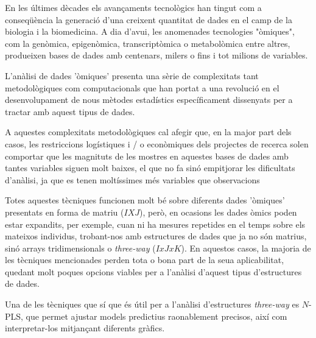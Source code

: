 
En les últimes dècades els avançaments tecnològics han tingut com a conseqüència la generació d'una creixent quantitat de dades en el camp de la biologia i la biomedicina. A dia d'avui, les anomenades tecnologies "òmiques", com la genòmica, epigenòmica, transcriptòmica o metabolòmica entre altres, produeixen bases de dades amb centenars, milers o fins i tot milions de variables. 

L'anàlisi de dades 'òmiques' presenta una sèrie de complexitats tant metodològiques com computacionals que han portat a una revolució en el desenvolupament de nous mètodes estadístics específicament dissenyats per a tractar amb aquest tipus de dades.

A aquestes complexitats metodològiques cal afegir que, en la major part dels casos, les restriccions logístiques i / o econòmiques dels projectes de recerca solen comportar que les magnituts de les mostres en aquestes bases de dades amb tantes variables siguen molt baixes, el que no fa sinó empitjorar les dificultats d'anàlisi, ja que es tenen moltíssimes més variables que observacions

Totes aquestes tècniques funcionen molt bé sobre diferents dades 'òmiques' presentats en forma de matriu ($IXJ$), però, en ocasions les dades òmics poden estar expandits, per exemple, cuan ni ha mesures repetides en el temps sobre els mateixos individus, trobant-nos amb estructures de dades que ja no són matrius, sinó arrays tridimensionals o \textit{three-way} ($IxJxK$). En aquestos casos, la majoria de les tècniques mencionades perden tota o bona part de la seua aplicabilitat, quedant molt poques opcions viables per a l'anàlisi d'aquest tipus d'estructures de dades.

Una de les tècniques que sí que és útil per a l'anàlisi d'estructures \textit{three-way} es $N$-PLS, que permet ajustar models predictius raonablement precisos, així com interpretar-los mitjançant diferents gràfics.

